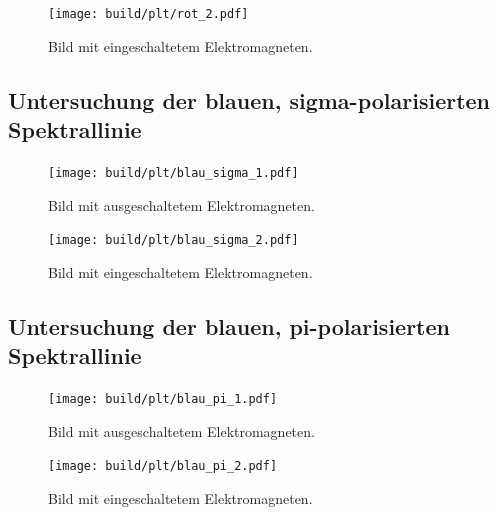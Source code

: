 \begin{figure}
    \centering
    \texttt{[image: build/plt/rot\_2.pdf]}
    \caption{Bild mit eingeschaltetem Elektromagneten.}
    \label{fig:plt:rot_2}
\end{figure}


\FloatBarrier
\subsection{Untersuchung der blauen, sigma-polarisierten Spektrallinie}
\lipsum[1]

\begin{figure}
    \centering
    \texttt{[image: build/plt/blau\_sigma\_1.pdf]}
    \caption{Bild mit ausgeschaltetem Elektromagneten.}
    \label{fig:plt:blau_sigma_1}
\end{figure}

\begin{figure}
    \centering
    \texttt{[image: build/plt/blau\_sigma\_2.pdf]}
    \caption{Bild mit eingeschaltetem Elektromagneten.}
    \label{fig:plt:blau_sigma_2}
\end{figure}


\FloatBarrier
\subsection{Untersuchung der blauen, pi-polarisierten Spektrallinie}
\lipsum[1]

\begin{figure}
    \centering
    \texttt{[image: build/plt/blau\_pi\_1.pdf]}
    \caption{Bild mit ausgeschaltetem Elektromagneten.}
    \label{fig:plt:blau_pi_1}
\end{figure}

\begin{figure}
    \centering
    \texttt{[image: build/plt/blau\_pi\_2.pdf]}
    \caption{Bild mit eingeschaltetem Elektromagneten.}
    \label{fig:plt:blau_pi_2}
\end{figure}
